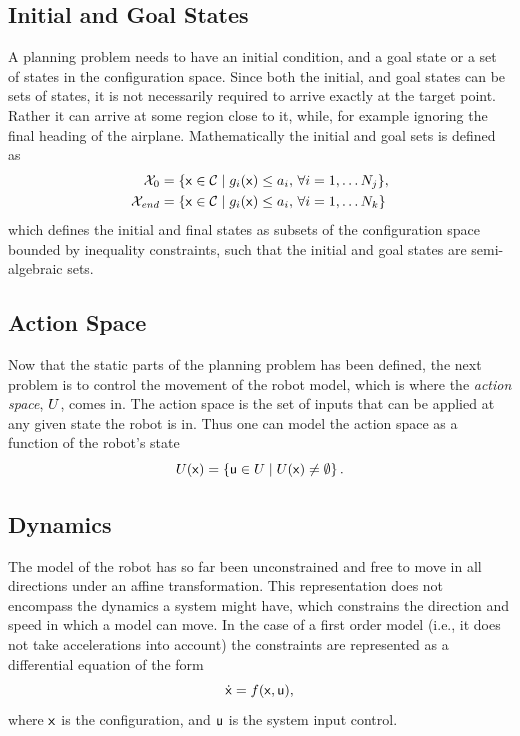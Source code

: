 \subsection{Initial and Goal States}

A planning problem needs to have an initial condition, and a goal state or a set
of states in the configuration space. Since both the initial, and goal states
can be sets of states, it is not necessarily required to arrive exactly at the
target point. Rather it can arrive at some region close to it, while, for
example ignoring the final heading of the airplane. Mathematically the initial
and goal sets is defined as
\begin{align*}
  \mathcal{X}_0 &= \lbrace {\mathbf{\mathsf{x}}} \in \mathcal{C}{} \mid g_i({\mathbf{\mathsf{x}}}) \leq a_i,
                  \, \forall i = 1,\ldots N_j\rbrace, \\
  \mathcal{X}_{\mathit{end}} &= \lbrace {\mathbf{\mathsf{x}}} \in \mathcal{C}{} \mid g_i({\mathbf{\mathsf{x}}}) \leq
                      a_i, \, \forall i = 1,\ldots N_k\rbrace
\end{align*}
which defines the initial and final states as subsets of the configuration space
bounded by inequality constraints, such that the initial and goal states are
semi-algebraic sets.


\subsection{Action Space}

Now that the static parts of the planning problem has been defined, the next
problem is to control the movement of the robot model, which is where the
\textit{action space}, \(U{}\), comes in. The action space is
the set of inputs that can be applied at any given state the robot is in. Thus
one can model the action space as a function of the robot's state
\[
  U({\mathbf{\mathsf{x}}}) = \lbrace{\mathbf{\mathsf{u}}} \in U \mid
    U({\mathbf{\mathsf{x}}}) \neq \emptyset \rbrace \, .
\]

\subsection{Dynamics}

The model of the robot has so far been unconstrained and free to move in all
directions under an affine transformation. This representation does not
encompass the dynamics a system might have, which constrains the direction and
speed in which a model can move. In the case of a first order model (i.e., it
does not take accelerations into account) the constraints are represented as a
differential equation of the form
\[
  \dot{{\mathbf{\mathsf{x}}}} = f({\mathbf{\mathsf{x}}},{\mathbf{\mathsf{u}}}),
\]
where \({\mathbf{\mathsf{x}}}\) is the configuration, and \({\mathbf{\mathsf{u}}}\) is the system input
control.

